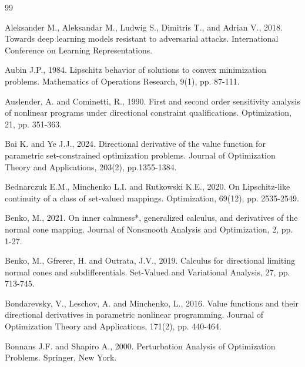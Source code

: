 \documentclass[11pt]{article}
\numberwithin{equation}{section}
\begin{document}
{  


\begin{thebibliography}{99}

 Aleksander M., Aleksandar M., Ludwig S., Dimitris T., and Adrian V., 2018. Towards deep learning models resistant to adversarial attacks. International Conference on Learning Representations.

 Aubin J.P., 1984. Lipschitz behavior of solutions to convex minimization problems. Mathematics of Operations Research, 9(1), pp. 87-111.


 Auslender, A. and Cominetti, R., 1990. First and second order sensitivity analysis of nonlinear programs under directional constraint qualifications. Optimization, 21, pp. 351-363.




 Bai K. and Ye J.J., 2024. Directional derivative of the value function for parametric set-constrained optimization problems. Journal of Optimization Theory and Applications, 203(2), pp.1355-1384.

 Bednarczuk E.M., Minchenko L.I. and Rutkowski K.E., 2020. On Lipschitz-like continuity of a class of set-valued mappings. Optimization, 69(12), pp. 2535-2549.

 Benko, M., 2021. On inner calmness*, generalized calculus, and derivatives of the normal cone mapping. Journal of Nonsmooth Analysis and Optimization, 2, pp. 1-27.

 Benko, M., Gfrerer, H. and Outrata, J.V., 2019. Calculus for directional limiting normal cones and subdifferentials. Set-Valued and Variational Analysis, 27, pp. 713-745.

 Bondarevsky, V., Leschov, A. and Minchenko, L., 2016. Value functions and their directional derivatives in parametric nonlinear programming. Journal of Optimization Theory and Applications, 171(2), pp. 440-464.

 Bonnans J.F. and Shapiro A., 2000. Perturbation Analysis of Optimization Problems. Springer, New York.


\end{thebibliography}}
\end{document}
